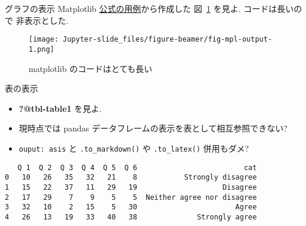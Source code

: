 \documentclass[
  ignorenonframetext,
]{beamer}
\providecommand{\tightlist}{%
  \setlength{\itemsep}{0pt}\setlength{\parskip}{0pt}}
\begin{document}
\begin{frame}{グラフの表示}
\protect\hypertarget{ux30b0ux30e9ux30d5ux306eux8868ux793a}{}
Matplotlib
\href{https://matplotlib.org/stable/gallery/lines_bars_and_markers/horizontal_barchart_distribution.html\#sphx-glr-gallery-lines-bars-and-markers-horizontal-barchart-distribution-py}{公式の用例}から作成した
図~\ref{fig-mpl} を見よ. コードは長いので 非表示とした.

\begin{figure}

{\centering \texttt{[image: Jupyter-slide\_files/figure-beamer/fig-mpl-output-1.png]}

}

\caption{\label{fig-mpl}matplotlib のコードはとても長い}

\end{figure}
\end{frame}

\begin{frame}[fragile]{表の表示}
\protect\hypertarget{ux8868ux306eux8868ux793a}{}
\begin{itemize}
\tightlist
\item
  \textbf{?@tbl-table1} を見よ.
\item
  現時点では pandas データフレームの表示を表として相互参照できない?
\item
  \texttt{ouput:\ asis} と \texttt{.to\_markdown()} や
  \texttt{.to\_latex()} 併用もダメ?
\end{itemize}

\begin{verbatim}
   Q 1  Q 2  Q 3  Q 4  Q 5  Q 6                         cat
0   10   26   35   32   21    8           Strongly disagree
1   15   22   37   11   29   19                    Disagree
2   17   29    7    9    5    5  Neither agree nor disagree
3   32   10    2   15    5   30                       Agree
4   26   13   19   33   40   38              Strongly agree
\end{verbatim}
\end{frame}
\end{document}
